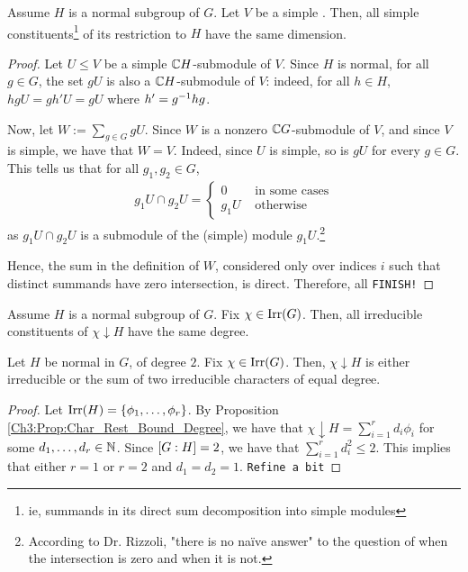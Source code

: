 \begin{proposition}
    Assume $H$ is a normal subgroup of $G$. Let $V$ be a simple \CGM. Then, all simple constituents\footnote{ie, summands in its direct sum decomposition into simple modules} of its restriction to $H$ have the same dimension.
\end{proposition}
\begin{proof}
    Let $U \leq V$ be a simple $\mathbb{C} H$-submodule of $V$. Since $H$ is normal, for all $g \in G$, the set $gU$ is also a $\mathbb{C} H$-submodule of $V$: indeed, for all $h \in H$, $hg U = g h' U = g U$ where $h' = g^{-1} h g$.

    Now, let $W := \sum_{g \in G} gU$. Since $W$ is a nonzero $\mathbb{C} G$-submodule of $V$, and since $V$ is simple, we have that $W = V$. Indeed, since $U$ is simple, so is $gU$ for every $g \in G$. This tells us that for all $g_1, g_2 \in G$,
    \begin{align*}
        g_1 U \cap g_2 U = \begin{cases}
            0 & \text{ in some cases} \\
            g_1 U & \text{ otherwise}
        \end{cases}
    \end{align*}
    as $g_1 U \cap g_2 U$ is a submodule of the (simple) module $g_1 U$.\footnote{According to Dr. Rizzoli, "there is no naïve answer" to the question of when the intersection is zero and when it is not.}

    Hence, the sum in the definition of $W$, considered only over indices $i$ such that distinct summands have zero intersection, is direct. Therefore, all \verb|FINISH!|
\end{proof}

\begin{corollary}\label{Ch3:Cor:NSGp_Irred_Constit_Char}
    Assume $H$ is a normal subgroup of $G$. Fix $\chi \in \operatorname{Irr}\!\left( G \right)$. Then, all irreducible constituents of $\chi \downarrow H$ have the same degree.
\end{corollary}

\begin{proposition}
    Let $H$ be normal in $G$, of degree $2$. Fix $\chi \in \operatorname{Irr}\!\left( G \right)$. Then, $\chi \downarrow H$ is either irreducible or the sum of two irreducible characters of equal degree.
\end{proposition}
\begin{proof}
    Let $\operatorname{Irr}\!\left( H \right) = \left\{ \phi_1, \ldots, \phi_r \right\}$. By Proposition \ref{Ch3:Prop:Char_Rest_Bound_Degree}, we have that $\chi \downarrow H = \sum_{i=1}^{r} d_i \phi_i$ for some $d_1, \ldots, d_r \in \mathbb{N}$. Since $\left[ G : H \right] = 2$, we have that $\sum_{i=1}^{r} d_i^2 \leq 2$. This implies that either $r = 1$ or $r = 2$ and $d_1 = d_2 = 1$. \verb|Refine a bit|
\end{proof}

